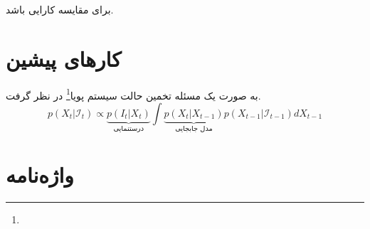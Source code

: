 \documentclass[11pt]{article}
\begin{document}
برای مقایسه کارایی باشد.


\section{کارهای پیشین}\label{sec2}
به صورت یک مسئله تخمین حالت  سیستم پویا\footnote{} در نظر گرفت.
\begin{equation}\label{equ:bayes}
p(X_t|\mathcal{I}_t) \propto  \underbrace{p(I_t|X_t)}_\text{درستنمایی}  \int{ \underbrace{p(X_t|X_{t-1})}_\text{مدل جابجایی} p(X_{t-1}|\mathcal{I}_{t-1}) dX_{t-1}}
\end{equation}

\linespread{1}
\small
\setlength{\parskip}{0pt}
\setlength{\parsep}{0pt}

\renewcommand{\bibname}{مراجع}
\begin{latin}

%

\end{latin}



\section*{واژه‌نامه}
\begin{multicols}{3}
\theendnotes 
\end{multicols}
\end{document}
